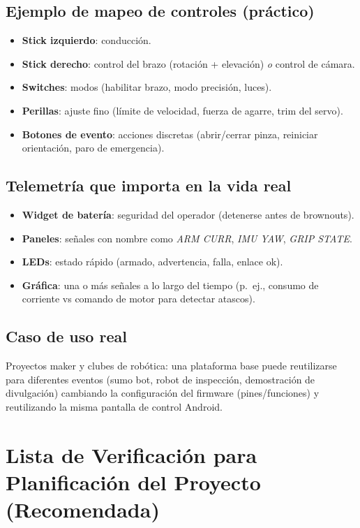 \subsection*{Ejemplo de mapeo de controles (práctico)}
\begin{itemize}
    \item \textbf{Stick izquierdo}: conducción.
    \item \textbf{Stick derecho}: control del brazo (rotación + elevación) \emph{o} control de cámara.
    \item \textbf{Switches}: modos (habilitar brazo, modo precisión, luces).
    \item \textbf{Perillas}: ajuste fino (límite de velocidad, fuerza de agarre, trim del servo).
    \item \textbf{Botones de evento}: acciones discretas (abrir/cerrar pinza, reiniciar orientación, paro de emergencia).
\end{itemize}

\subsection*{Telemetría que importa en la vida real}
\begin{itemize}
    \item \textbf{Widget de batería}: seguridad del operador (detenerse antes de brownouts).
    \item \textbf{Paneles}: señales con nombre como \textit{ARM CURR}, \textit{IMU YAW}, \textit{GRIP STATE}.
    \item \textbf{LEDs}: estado rápido (armado, advertencia, falla, enlace ok).
    \item \textbf{Gráfica}: una o más señales a lo largo del tiempo (p.\ ej., consumo de corriente vs comando de motor para detectar atascos).
\end{itemize}

\subsection*{Caso de uso real}
Proyectos maker y clubes de robótica: una plataforma base puede reutilizarse para diferentes eventos (sumo bot, robot de inspección, demostración de divulgación) cambiando la configuración del firmware (pines/funciones) y reutilizando la misma pantalla de control Android.

\section{Lista de Verificación para Planificación del Proyecto (Recomendada)}
\label{sec:planning-checklist}

